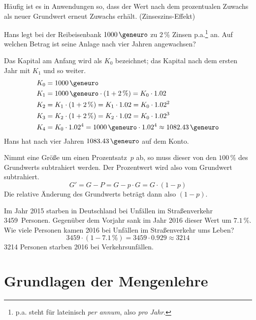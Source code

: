 Häufig ist es in Anwendungen so, dass der Wert nach dem prozentualen Zuwachs als neuer Grundwert erneut Zuwachs erhält. (Zinseszins-Effekt)

\begin{bsp}[Zinseszins]
 Hans legt bei der Reibeisenbank \(1000\,\geneuro\) zu \(2\,\%\) Zinsen p.a.\footnote{p.a. steht für lateinisch \emph{per annum}, also \emph{pro Jahr}.} an. Auf welchen Betrag ist seine Anlage nach vier Jahren angewachsen?
 
 Das Kapital am Anfang wird als \(K_0\) bezeichnet; das Kapital nach dem ersten Jahr mit \(K_1\) und so weiter.
 \begin{align*}
  K_0 &= 1000\,\geneuro\\
  K_1 &= 1000\,\geneuro \cdot (1+2\,\%) = K_0 \cdot 1.02\\
  K_2 &= K_1 \cdot (1+2\,\%) = K_1 \cdot 1.02 = K_0\cdot 1.02^2\\
  K_3 &= K_2\cdot  (1+2\,\%) = K_2 \cdot 1.02 = K_0 \cdot 1.02^3\\
  K_4 &= K_0\cdot 1.02^4 = 1000\,\geneuro \cdot 1.02^4 \approx 1082.43\,\geneuro
 \end{align*}
 Hans hat nach vier Jahren \(1083.43\,\geneuro\) auf dem Konto.
\end{bsp}

\begin{regel}
  Nimmt eine Größe um einen Prozentsatz~\(p\) ab, so muss dieser von den \(100\,\%\) des Grundwerts subtrahiert werden. Der Prozentwert wird also vom Grundwert subtrahiert.
  \begin{equation*}
  G' = G - P = G - p\cdot G = G\cdot (1-p)
 \end{equation*}
 Die relative Änderung des Grundwerts beträgt dann also \((1-p)\).
\end{regel}

\begin{bsp}
 Im Jahr 2015 starben in Deutschland bei Unfällen im Straßenverkehr 3459~Personen. Gegenüber dem Vorjahr sank im Jahr 2016 dieser Wert um \(7.1\,\%\). Wie viele Personen kamen 2016 bei Unfällen im Straßenverkehr ums Leben?
 \begin{equation*}
  3459 \cdot (1-7.1\,\%) = 3459 \cdot 0.929 \approx 3214
 \end{equation*}
 3214 Personen starben 2016 bei Verkehrsunfällen.
\end{bsp}

\section{Grundlagen der Mengenlehre}

